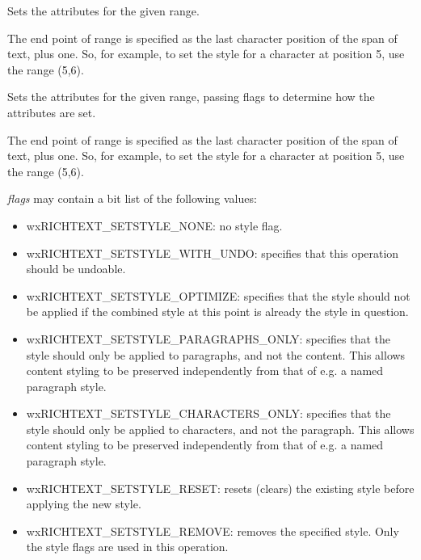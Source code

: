Sets the attributes for the given range.

The end point of range is specified as the last character position of the span of text, plus one.
So, for example, to set the style for a character at position 5, use the range (5,6).

\label{wxrichtextctrlsetstyleex}



Sets the attributes for the given range, passing flags to determine how the attributes are set.

The end point of range is specified as the last character position of the span of text, plus one.
So, for example, to set the style for a character at position 5, use the range (5,6).

{\it flags} may contain a bit list of the following values:

\begin{itemize}\itemsep=0pt
\item wxRICHTEXT\_SETSTYLE\_NONE: no style flag.
\item wxRICHTEXT\_SETSTYLE\_WITH\_UNDO: specifies that this operation should be undoable.
\item wxRICHTEXT\_SETSTYLE\_OPTIMIZE: specifies that the style should not be applied if the
combined style at this point is already the style in question.
\item wxRICHTEXT\_SETSTYLE\_PARAGRAPHS\_ONLY: specifies that the style should only be applied to paragraphs,
and not the content. This allows content styling to be preserved independently from that of e.g. a named paragraph style.
\item wxRICHTEXT\_SETSTYLE\_CHARACTERS\_ONLY: specifies that the style should only be applied to characters,
and not the paragraph. This allows content styling to be preserved independently from that of e.g. a named paragraph style.
\item wxRICHTEXT\_SETSTYLE\_RESET: resets (clears) the existing style before applying the new style.
\item wxRICHTEXT\_SETSTYLE\_REMOVE: removes the specified style. Only the style flags are used in this operation.
\end{itemize}

